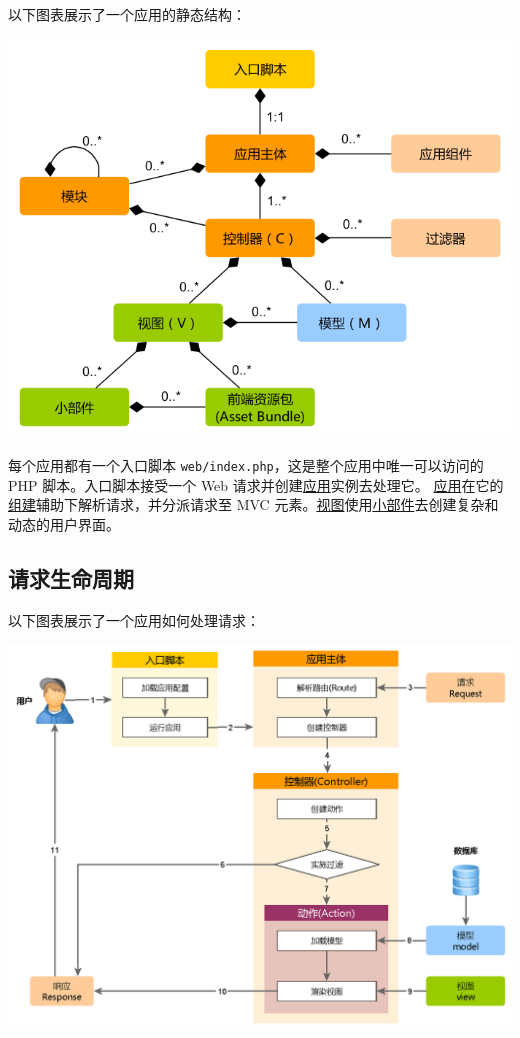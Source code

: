 以下图表展示了一个应用的静态结构：

\noindent\includegraphics[width=\textwidth]{images/application-structure.png}

每个应用都有一个入口脚本 \lstinline|web/index.php|，这是整个应用中唯一可以访问的 PHP 脚本。入口脚本接受一个 Web 请求并创建\hyperref[structure-application.md]{应用}实例去处理它。 \hyperref[structure-applications.md]{应用}在它的\hyperref[concept-components.md]{组建}辅助下解析请求，并分派请求至 MVC 元素。\hyperref[structure-views.md]{视图}使用\hyperref[structure-widgets.md]{小部件}去创建复杂和动态的用户界面。

\subsection{请求生命周期 \label{start-workflow.md::request-lifecycle}}
以下图表展示了一个应用如何处理请求：

\noindent\includegraphics[width=\textwidth]{images/application-lifecycle.png}

